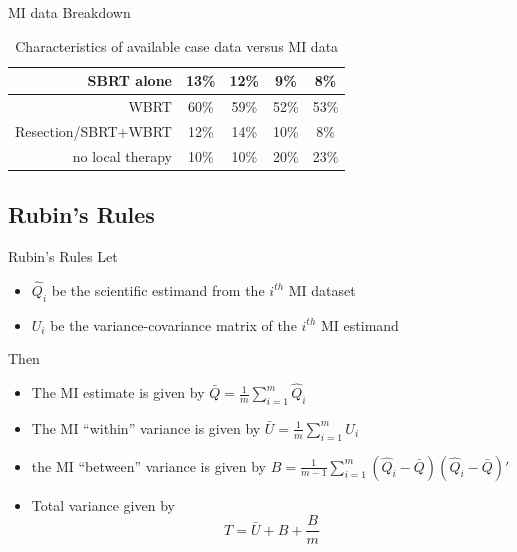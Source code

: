 \begin{frame}{MI data Breakdown}
\begin{table}[!ht]
{\begin{tabular}{|r|c|c|c|c|}
SBRT alone                                        & 13\%                                                                  & 12\%                                                      & 9\%                                                                      & 8\%                                                          \\ \hline
WBRT                                              & 60\%                                                                  & 59\%                                                      & 52\%                                                                     & 53\%                                                         \\ \hline
Resection/SBRT+WBRT                               & 12\%                                                                  & 14\%                                                      & 10\%                                                                     & 8\%                                                          \\ \hline
no local therapy                                  & 10\%                                                                  & 10\%                                                      & 20\%                                                                     & 23\%                                                         \\ \hline
\end{tabular}
}
\caption{Characteristics of available case data versus MI data}
\label{table:chartab}
\end{table}
 
\end{frame}

\subsection{Rubin's Rules}
\begin{frame}{Rubin's Rules}
 Let
 \begin{itemize}
  \item $\hat{Q}_i$ be the scientific estimand from the $i^{th}$ MI dataset
  \item $U_i$ be the variance-covariance matrix of the $i^{th}$ MI estimand
 \end{itemize}
Then
\begin{itemize}
 \item The MI estimate is given by
 $\bar{Q}=\frac{1}{m}\sum_{i=1}^{m}\hat{Q}_i$
 \item The MI ``within'' variance is given by
 $\bar{U}=\frac{1}{m}\sum_{i=1}^{m}U_i$
 \item the MI ``between'' variance is given by
 $B=\frac{1}{m-1}\sum_{i=1}^{m}(\hat{Q}_i - \bar{Q})(\hat{Q}_i - \bar{Q})'$ %
   \item Total variance given by \cite{Rubin1987}
  $$T=\bar{U}+B +\frac{B}{m}$$
\end{itemize}

\end{frame}

